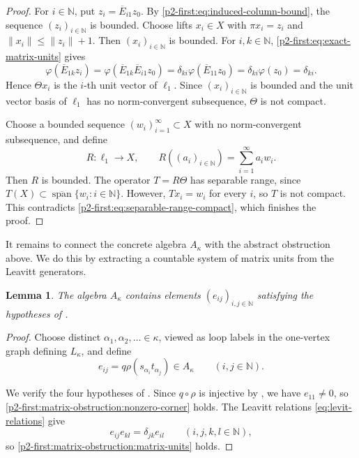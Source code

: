 \documentclass[11pt,reqno]{amsart}
\makeatletter
\theoremstyle{plain}
\newtheorem{lemma}[lemma]{Lemma}
\theoremstyle{definition}
\newcommand{\N}{\mathbb N}
\newcommand{\spann}{\operatorname{span}}
\newcounter{problempaper}
\newenvironment{problempaperbody}{%
  \setcounter{subsection}{0}%
  \setcounter{subsubsection}{0}%
  \setcounter{paragraph}{0}%
  \renewcommand{\thesubsection}{\arabic{subsection}}%
  \renewcommand{\thesubsubsection}{\thesubsection.\arabic{subsubsection}}%
  \renewcommand{\theparagraph}{\thesubsubsection.\arabic{paragraph}}%
  \let\problem@outersection\section
  \let\problem@outersubsection\subsection
  \let\problem@outersubsubsection\subsubsection
  \let\problem@outerparagraph\paragraph
  \let\section\problem@papersection
  \let\subsection\problem@papersubsection
  \let\subsubsection\problem@papersubsubsection
}{%
  \let\section\problem@outersection
  \let\subsection\problem@outersubsection
  \let\subsubsection\problem@outersubsubsection
  \let\paragraph\problem@outerparagraph
}
\newcommand{\problem@target}[2]{%
  \hypertarget{problem-\theproblempaper-#1-#2}{}%
}
\newcommand{\problem@paperheading}[3]{%
  \par\bigskip
  \problem@target{#1}{#2}%
  \noindent{\large\bfseries #2.\quad #3\par}%
  \nobreak\smallskip
}
\newcommand{\problem@papersubheading}[3]{%
  \par\medskip
  \problem@target{#1}{#2}%
  \noindent{\normalsize\bfseries #2.\quad #3\par}%
  \nobreak\smallskip
}
\newcommand{\problem@papersubsubheading}[3]{%
  \par\smallskip
  \problem@target{#1}{#2}%
  \noindent{\normalsize\itshape #2.\quad #3.\ }%
}
\def\problem@papersection{%
  \@ifstar{\problem@papersectionstar}{\problem@papersectionnostar}%
}
\def\problem@papersectionstar#1{%
  \par\bigskip\noindent{\large\bfseries #1\par}\nobreak\smallskip
}
\def\problem@papersectionnostar#1{%
  \refstepcounter{subsection}%
  \setcounter{subsubsection}{0}%
  \setcounter{paragraph}{0}%
  \problem@paperheading{section}{\thesubsection}{#1}%
  \problem@writecontentsline{section}{\thesubsection}{#1}%
}
\def\problem@papersubsection{%
  \@ifstar{\problem@papersubsectionstar}{\problem@papersubsectionnostar}%
}
\def\problem@papersubsectionstar#1{%
  \par\medskip\noindent{\normalsize\bfseries #1\par}\nobreak\smallskip
}
\def\problem@papersubsectionnostar#1{%
  \refstepcounter{subsubsection}%
  \setcounter{paragraph}{0}%
  \problem@papersubheading{subsection}{\thesubsubsection}{#1}%
  \problem@writecontentsline{subsection}{\thesubsubsection}{#1}%
}
\def\problem@papersubsubsection{%
  \@ifstar{\problem@papersubsubsectionstar}{\problem@papersubsubsectionnostar}%
}
\def\problem@papersubsubsectionstar#1{%
  \par\smallskip\noindent{\normalsize\itshape #1.\ }%
}
\def\problem@papersubsubsectionnostar#1{%
  \refstepcounter{paragraph}%
  \problem@papersubsubheading{subsubsection}{\theparagraph}{#1}%
  \problem@writecontentsline{subsubsection}{\theparagraph}{#1}%
}
\newcommand{\problem@writecontentsline}[3]{%
  \begingroup
  \protected@write\@auxout{}{%
    \string\problemcontentsentry{\theproblempaper}{#1}{#2}{#3}{\thepage}%
  }%
  \endgroup
}
\newcommand{\problemcontentsentry}[5]{%
  \@ifundefined{problemcontents@#1}{%
    \expandafter\gdef\csname problemcontents@#1\endcsname{}%
  }{}%
  \expandafter\g@addto@macro\csname problemcontents@#1\endcsname{%
    \problemcontentsline{#1}{#2}{#3}{#4}{#5}%
  }%
}
\newcommand{\problemcontentslink}[4]{%
  \hyperlink{problem-#1-#2-#3}{#4}%
}
\newcommand{\problemcontentsline}[5]{%
  \ifstrequal{#2}{section}{%
    \par\noindent
    \problemcontentslink{#1}{#2}{#3}{\makebox[2.5em][l]{#3}#4}%
    \nobreak\dotfill
    \problemcontentslink{#1}{#2}{#3}{#5}\par
  }{%
    \ifstrequal{#2}{subsection}{%
      \par\noindent\hspace*{1.5em}%
      \problemcontentslink{#1}{#2}{#3}{\makebox[3.5em][l]{#3}#4}%
      \nobreak\dotfill
      \problemcontentslink{#1}{#2}{#3}{#5}\par
    }{%
      \par\noindent\hspace*{3em}%
      \problemcontentslink{#1}{#2}{#3}{\makebox[4.5em][l]{#3}#4}%
      \nobreak\dotfill
      \problemcontentslink{#1}{#2}{#3}{#5}\par
    }%
  }%
}
\makeatother
\begin{document}
\begin{problempaperbody}
\begin{proof}
For $i\in\N$, put $z_i=\overline E_{i1}z_0$. By \eqref{p2-first:eq:induced-column-bound}, the sequence $(z_i)_{i \in \N}$ is bounded. Choose lifts $x_i\in X$ with $\pi x_i=z_i$ and $\|x_i\|\leq\|z_i\|+1$. Then $(x_i)_{i \in \N}$ is bounded. For $i,k\in\N$, \eqref{p2-first:eq:exact-matrix-units} gives
\begin{equation*}
        \varphi(\overline E_{1k}z_i)=\varphi(\overline E_{1k}\overline E_{i1}z_0)=\delta_{ki}\varphi(\overline E_{11}z_0) = \delta_{ki} \varphi(z_0) =\delta_{ki}.
\end{equation*}
Hence $\Theta x_i$ is the $i$-th unit vector of $\ell_1$. Since $(x_i)_{i \in \N}$ is bounded and the unit vector basis of $\ell_1$ has no norm-convergent subsequence, $\Theta$ is not compact.

Choose a bounded sequence $(w_i)_{i=1}^{\infty}\subset X$ with no norm-convergent subsequence, and define
\begin{equation*}
        R:\ell_1\to X,\qquad R((a_i)_{i \in \N})=\sum_{i=1}^{\infty}a_iw_i.
\end{equation*}
Then $R$ is bounded. The operator $T=R\Theta$ has separable range, since $T(X)\subset\overline{\spann}\{w_i:i\in\N\}$. However, $Tx_i=w_i$ for every $i$, so $T$ is not compact. This contradicts \eqref{p2-first:eq:separable-range-compact}, which finishes the proof.
\end{proof}

It remains to connect the concrete algebra $A_\kappa$ with the abstract obstruction above. We do this by extracting a countable system of matrix units from the Leavitt generators.

\begin{lemma}
\label{p2-first:lem:Akappa-has-matrix-units}
The algebra $A_\kappa$ contains elements $(e_{ij})_{i,j\in\N}$ satisfying the hypotheses of .
\end{lemma}

\begin{proof}
Choose distinct $\alpha_1,\alpha_2,\ldots\in\kappa$, viewed as loop labels in the one-vertex graph defining $L_\kappa$, and define
\begin{equation*}
        e_{ij}=q\rho(s_{\alpha_i}t_{\alpha_j})\in A_\kappa
        \qquad(i,j\in\N).
\end{equation*}

We verify the four hypotheses of . Since $q\circ\rho$ is injective by , we have $e_{11}\ne0$, so \ref{p2-first:matrix-obstruction:nonzero-corner} holds. The Leavitt relations \eqref{eq:levit-relations} give
\begin{equation*}
        e_{ij}e_{kl}=\delta_{jk}e_{il}
        \qquad(i,j,k,l\in\N),
\end{equation*}
so \ref{p2-first:matrix-obstruction:matrix-units} holds.


\end{proof}
\end{problempaperbody}
\end{document}
